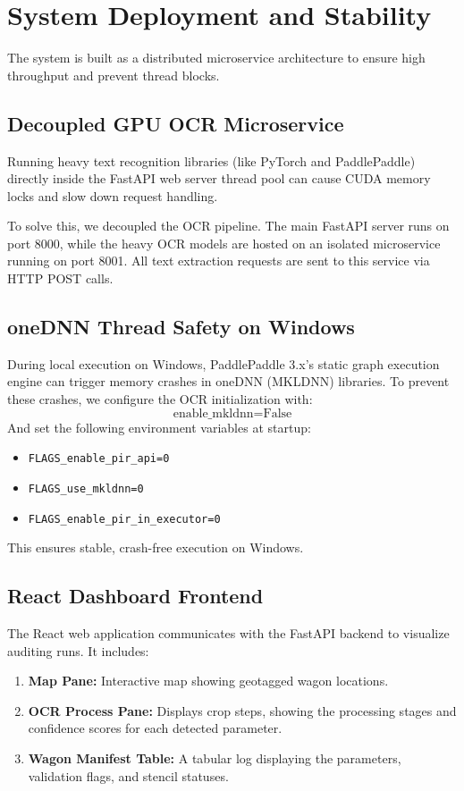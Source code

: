 \documentclass[conference]{IEEEtran}
\begin{document}
\begin{table}[t]
\section{System Deployment and Stability}
The system is built as a distributed microservice architecture to ensure high throughput and prevent thread blocks.

\subsection{Decoupled GPU OCR Microservice}
Running heavy text recognition libraries (like PyTorch and PaddlePaddle) directly inside the FastAPI web server thread pool can cause CUDA memory locks and slow down request handling. 

To solve this, we decoupled the OCR pipeline. The main FastAPI server runs on port 8000, while the heavy OCR models are hosted on an isolated microservice running on port 8001. All text extraction requests are sent to this service via HTTP POST calls.

\subsection{oneDNN Thread Safety on Windows}
During local execution on Windows, PaddlePaddle 3.x's static graph execution engine can trigger memory crashes in oneDNN (MKLDNN) libraries. To prevent these crashes, we configure the OCR initialization with:
\begin{equation}
\text{enable\_mkldnn} = \text{False}
\end{equation}
And set the following environment variables at startup:
\begin{itemize}
    \item \texttt{FLAGS\_enable\_pir\_api=0}
    \item \texttt{FLAGS\_use\_mkldnn=0}
    \item \texttt{FLAGS\_enable\_pir\_in\_executor=0}
\end{itemize}
This ensures stable, crash-free execution on Windows.

\subsection{React Dashboard Frontend}
The React web application communicates with the FastAPI backend to visualize auditing runs. It includes:
\begin{enumerate}
    \item \textbf{Map Pane:} Interactive map showing geotagged wagon locations.
    \item \textbf{OCR Process Pane:} Displays crop steps, showing the processing stages and confidence scores for each detected parameter.
    \item \textbf{Wagon Manifest Table:} A tabular log displaying the parameters, validation flags, and stencil statuses.
\end{enumerate}


\end{table}
\end{document}
